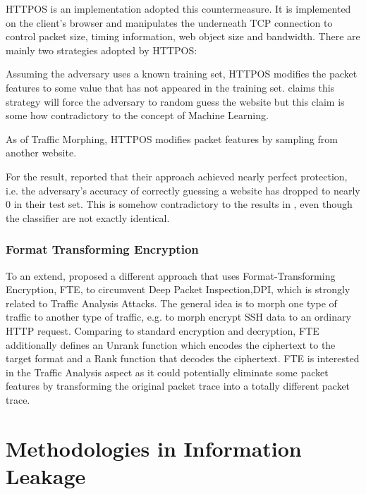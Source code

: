 HTTPOS\cite{HTTPOS} is an implementation adopted this countermeasure. It is implemented on the client's  browser and manipulates the underneath TCP connection to control packet size, timing information, web object size and bandwidth. There are mainly two strategies adopted by HTTPOS:

\begin{description}[style=nextline]
	\item[The Diffusion Strategy]
	 Assuming the adversary uses a known training set, HTTPOS modifies the packet features to some value that has not appeared in the training set. \cite{HTTPOS} claims this strategy will force the adversary to random guess the website but this claim is some how contradictory to the concept of Machine Learning.
	\item[The Confusion Strategy]
	As of Traffic Morphing, HTTPOS modifies packet features by sampling from another website.
\end{description}

For the result, \cite{HTTPOS} reported that their approach achieved nearly perfect protection, i.e. the adversary's accuracy of correctly guessing a website has  dropped to nearly 0 in their test set. This is somehow contradictory to the results in \cite{Peekaboo}, even though the classifier are not exactly identical.

\subsubsection{Format Transforming Encryption}

To an extend, \cite{FTE} proposed a different approach that uses Format-Transforming Encryption, FTE, to circumvent Deep Packet Inspection,DPI, which is strongly related to Traffic Analysis Attacks. The general idea is to morph one type of traffic to another type of traffic, e.g. to morph encrypt SSH data to an ordinary HTTP request. Comparing to standard encryption and decryption, FTE additionally defines an Unrank function which encodes the ciphertext to the target format and a Rank function that decodes the ciphertext. FTE is interested in the Traffic Analysis aspect as it could potentially eliminate some packet features by transforming the original packet trace into a totally different packet trace.

\section{Methodologies in Information Leakage }


